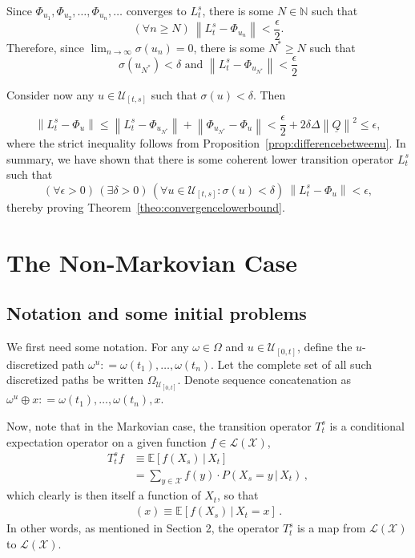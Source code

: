 \documentclass[a4paper,reqno]{amsart}
\newcommand{\nats}{\mathbb{N}}
\newcommand{\states}{\mathcal{X}}
\newcommand{\lbound}{L}
\newcommand{\gambles}{\mathcal{L}}
\newcommand{\gamblesX}{\gambles(\states)}
\newcommand{\lrate}{\underline{Q}}
\newcommand{\norm}[1]{\left\lVert #1 \right\rVert}
\newcommand{\coloneqq}{:\!=}
\begin{document}
Since $\Phi_{u_1},\Phi_{u_2},\dots,\Phi_{u_n},\dots$ converges to $\lbound_t^s$, there is some $N\in\nats$ such that
\begin{equation*}
(\forall n\geq N)~\norm{\lbound_t^s - \Phi_{u_n}}<\frac{\epsilon}{2}.
\end{equation*}
Therefore, since $\lim_{n\to\infty}\sigma(u_n)=0$, there is some $N^*\geq N$ such that
\begin{equation*}
\sigma(u_{N^*})<\delta\text{ and }\norm{\lbound_t^s - \Phi_{u_{N^*}}}<\frac{\epsilon}{2}
\end{equation*}

Consider now any $u\in\mathcal{U}_{[t,s]}$ such that $\sigma(u)<\delta$. Then

\begin{equation*}
\norm{\lbound_t^s - \Phi_u}\leq\norm{\lbound_t^s-\Phi_{u_{N^*}}}
+\norm{\Phi_{u_{N^*}}-\Phi_u}
<\frac{\epsilon}{2}+2\delta\Delta\norm{\lrate}^2\leq\epsilon,
\end{equation*}
where the strict inequality follows from Proposition~\ref{prop:differencebetweenu}.
In summary, we have shown that there is some coherent lower transition operator $\lbound_t^s$ such that
\begin{equation*}
(\forall\epsilon>0)\,
(\exists\delta>0)\,
(\forall u\in\mathcal{U}_{[t,s]}\colon\sigma(u)<\delta)~\norm{\lbound_t^s - \Phi_u}<\epsilon,
\end{equation*}
thereby proving Theorem~\ref{theo:convergencelowerbound}.

\newpage
\section{The Non-Markovian Case}

\subsection{Notation and some initial problems}

We first need some notation. For any $\omega\in\Omega$ and $u\in\mathcal{U}_{[0,t]}$, define the $u$-discretized path $\omega^u\coloneqq \omega(t_1),\ldots,\omega(t_n)$. Let the complete set of all such discretized paths be written $\Omega_{\mathcal{U}_{[0,t]}}$. Denote sequence concatenation as $\omega^u\oplus x\coloneqq \omega(t_1),\ldots,\omega(t_n),x$.

Now, note that in the Markovian case, the transition operator $T_t^s$ is a conditional expectation operator on a given function $f\in\gamblesX$,
\begin{align*}
T_t^s f &\equiv \mathbb{E}[f(X_s)\,\vert\,X_t] \\
 &= \sum_{y\in\states} f(y)\cdot P(X_s=y\,\vert\,X_t)\,,
\end{align*}
which clearly is then itself a function of $X_t$, so that
\begin{align*}
[T_t^s f](x) \equiv \mathbb{E}[f(X_s)\,\vert\,X_t=x]\,.
\end{align*}
In other words, as mentioned in Section 2, the operator $T_t^s$ is a map from $\gamblesX$ to $\gamblesX$.
\end{document}
